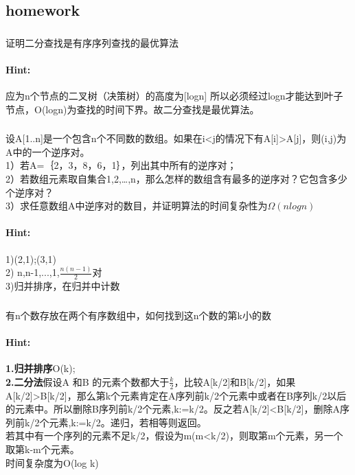 \documentclass{article}
\begin{document}
     \subsection{homework}
     
     \subsubsection{}证明二分查找是有序序列查找的最优算法
     \paragraph{Hint:}应为n个节点的二叉树（决策树）的高度为[logn] 所以必须经过logn才能达到叶子节点，O(logn)为查找的时间下界。故二分查找是最优算法。
     
     \subsubsection{}设A[1..n]是一个包含n个不同数的数组。如果在i<j的情况下有A[i]>A[j]，则(i,j)为A中的一个逆序对。\\
     1）若A=｛2，3，8，6，1｝，列出其中所有的逆序对；\\
     2）若数组元素取自集合{1,2,…,n}，那么怎样的数组含有最多的逆序对？它包含多少个逆序对？\\
     3）求任意数组A中逆序对的数目，并证明算法的时间复杂性为$\Omega (nlogn)$
     \paragraph{Hint:}1)(2,1);(3,1)\\
     2) n,n-1,...,1,$\frac{n(n-1)}{2}$对\\
     3)归并排序，在归并中计数


     \subsubsection{}有n个数存放在两个有序数组中，如何找到这n个数的第k小的数
     \paragraph{Hint:}\textbf{1.归并排序}O(k);\\
     \textbf{2.二分法}假设A 和B 的元素个数都大于$\frac{k}{2}$，比较A[k/2]和B[k/2]，如果A[k/2]>B[k/2]，那么第k个元素肯定在A序列前k/2个元素中或者在B序列k/2以后的元素中。所以删除B序列前k/2个元素,k:=k/2。反之若A[k/2]<B[k/2]，删除A序列前k/2个元素,k:=k/2。递归，若相等则返回。\\
     若其中有一个序列的元素不足k/2，假设为m(m<k/2)，则取第m个元素，另一个取第k-m个元素。\\
     时间复杂度为O(log k)
     
\end{document}
